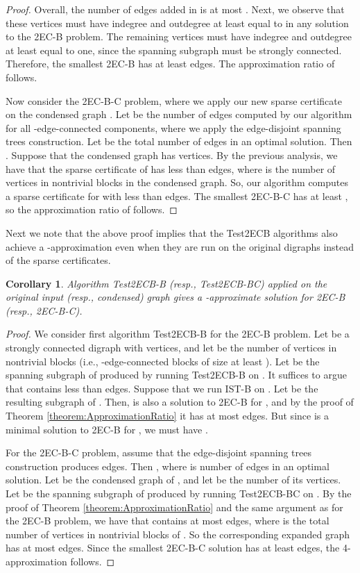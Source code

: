 \documentclass[11pt]{article}
\newtheorem{corollary}[theorem]{Corollary}
\begin{document}
\begin{proof}
Overall, the number of edges added in  is at most .
Next, we observe that these  vertices must have indegree and outdegree at least equal to  in any solution to the \textsf{2EC-B} problem.
The remaining  vertices must have indegree and outdegree at least equal to one, since the spanning subgraph must be strongly connected.
Therefore, the smallest \textsf{2EC-B} has at least  edges. The approximation ratio of  follows.

Now consider the \textsf{2EC-B-C} problem, where we apply our new sparse certificate on the condensed graph .
Let  be the number of edges computed by our algorithm for all -edge-connected components, where we apply the edge-disjoint spanning trees construction.
Let  be the total number of edges in an optimal solution. Then .
Suppose that the condensed graph has  vertices.
By the previous analysis, we have that the sparse certificate of  has less than  edges, where  is the number of vertices in nontrivial blocks in the condensed graph.
So, our algorithm computes a sparse certificate for  with less than  edges.
The smallest \textsf{2EC-B-C} has at least , so the approximation ratio of  follows.
\end{proof}

Next we note that the above proof implies that the \textsf{Test2ECB} algorithms also achieve a -approximation even when they are run on the original digraphs instead of the sparse certificates.

\begin{corollary}
\label{corollary:Test2CB-B}
Algorithm \textsf{Test2ECB-B} (resp., \textsf{Test2ECB-BC}) applied on the original input (resp., condensed) graph gives a -approximate solution for \textsf{2EC-B} (resp., \textsf{2EC-B-C}).
\end{corollary}
\begin{proof}
We consider first algorithm \textsf{Test2ECB-B} for the \textsf{2EC-B} problem.
Let  be a strongly connected digraph with  vertices, and let  be the number of vertices in nontrivial blocks (i.e., -edge-connected blocks of size at least ).
Let  be the spanning subgraph of  produced by running \textsf{Test2ECB-B} on . It suffices to argue that  contains less than  edges.
Suppose that we run \textsf{IST-B} on . Let  be the resulting subgraph of . Then,  is also a solution to \textsf{2EC-B} for , and by the proof of Theorem \ref{theorem:ApproximationRatio} it has at most  edges. But since  is a minimal solution to \textsf{2EC-B} for , we must have .

For the \textsf{2EC-B-C} problem, assume that the edge-disjoint spanning trees construction produces  edges.
Then , where  is number of edges in an optimal solution.
Let  be the condensed graph of , and let  be the number of its vertices.
Let  be the spanning subgraph of  produced by running \textsf{Test2ECB-BC} on . By the proof of Theorem \ref{theorem:ApproximationRatio} and the same argument as for the \textsf{2EC-B} problem, we have that   contains at most  edges, where  is the total number of vertices in nontrivial blocks of .
So the corresponding expanded graph has at most  edges.
Since the smallest \textsf{2EC-B-C} solution has at least  edges, the 4-approximation follows.
\end{proof}
\end{document}
